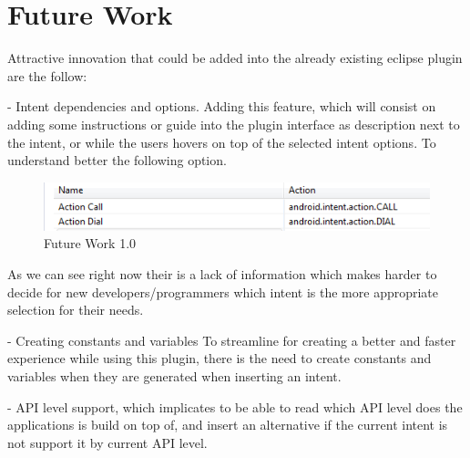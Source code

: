 \section{Future Work}
\label{futurework}

Attractive innovation that could be added into the already existing eclipse plugin are the follow:

- Intent dependencies and options.
	Adding this feature, which will consist on adding some instructions or guide into the plugin interface as description next to the intent, or while the users hovers on top of the selected intent options. To understand better the following option. 

\begin{figure}[H]
\label{codegeneratorview}
  \centering
    \includegraphics[width=\textwidth]{intentBefore}
  \caption{Future Work 1.0}
\end{figure}

	As we can see right now their is a lack of information which makes harder to decide for new developers/programmers which intent is the more appropriate selection for their needs.

- Creating constants and variables
	To streamline for creating a better and faster experience while using this plugin, there is the need to create constants and variables when they are generated when inserting an intent.

- API level support, which implicates to be able to read which API level does the applications is build on top of, and insert an alternative if the current intent is not support it by current API level.
	
